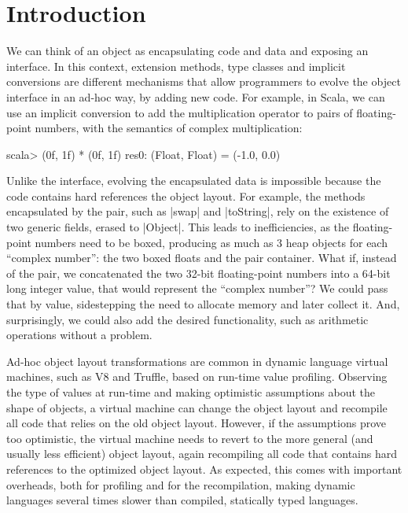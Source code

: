 \section{Introduction}
\label{sec:intro}

We can think of an object as encapsulating code and data and exposing an interface. In this context, extension methods, type classes and implicit conversions are different mechanisms that allow programmers to evolve the object interface in an ad-hoc way, by adding new code. For example, in Scala, we can use an implicit conversion to add the multiplication operator to pairs of floating-point numbers, with the semantics of complex multiplication:

\begin{lstlisting-nobreak}
scala> (0f, 1f) * (0f, 1f)
res0: (Float, Float) = (-1.0, 0.0)
\end{lstlisting-nobreak}

Unlike the interface, evolving the encapsulated data is impossible because the code contains hard references the object layout. For example, the methods encapsulated by the pair, such as |swap| and |toString|, rely on the existence of two generic fields, erased to |Object|. This leads to inefficiencies, as the floating-point numbers need to be boxed, producing as much as 3 heap objects for each ``complex number'': the two boxed floats and the pair container. What if, instead of the pair, we concatenated the two 32-bit floating-point numbers into a 64-bit long integer value, that would represent the ``complex number''? We could pass that by value, sidestepping the need to allocate memory and later collect it. And, surprisingly, we could also add the desired functionality, such as arithmetic operations without a problem.

Ad-hoc object layout transformations are common in dynamic language virtual machines, such as V8 and Truffle, based on run-time value profiling. Observing the type of values at run-time and making optimistic assumptions about the shape of objects, a virtual machine can change the object layout and recompile all code that relies on the old object layout. However, if the assumptions prove too optimistic, the virtual machine needs to revert to the more general (and usually less efficient) object layout, again recompiling all code that contains hard references to the optimized object layout. As expected, this comes with important overheads, both for profiling and for the recompilation, making dynamic languages several times slower than compiled, statically typed languages.

